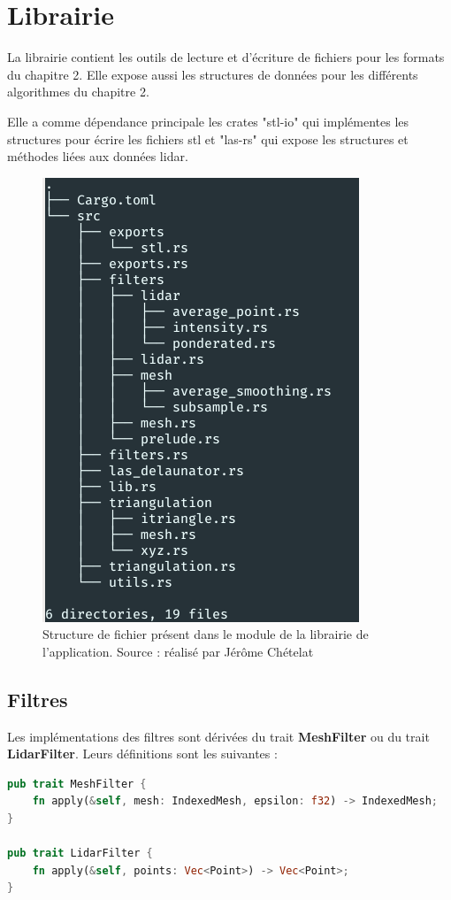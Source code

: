 \section{Librairie}

La librairie contient les outils de lecture et d'écriture de fichiers pour les formats du chapitre 2. Elle expose aussi les structures de données pour les différents algorithmes du chapitre 2.

Elle a comme dépendance principale les crates "stl-io" qui implémentes les structures pour écrire les fichiers \gls{stl} et "las-rs" qui expose les structures et méthodes liées aux données lidar.

\begin{figure}[htbp!]
    \centering
    \includegraphics[width=0.5\linewidth]{figures/architecture.png}
    \caption{Structure de fichier présent dans le module de la librairie de l'application. Source : réalisé par Jérôme Chételat}
    \label{fig:library_tree}
\end{figure}

\subsection{Filtres}
Les implémentations des filtres sont dérivées du trait \textbf{MeshFilter} ou du trait \textbf{LidarFilter}. Leurs définitions sont les suivantes :
\begin{lstlisting}[language=Rust, style=boxed]
pub trait MeshFilter {
    fn apply(&self, mesh: IndexedMesh, epsilon: f32) -> IndexedMesh;
}

pub trait LidarFilter {
    fn apply(&self, points: Vec<Point>) -> Vec<Point>;
}

\end{lstlisting}

